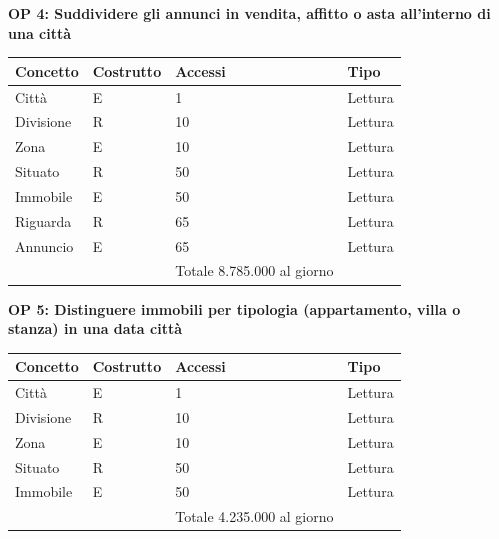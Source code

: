 \documentclass[a4paper,12pt]{report}
\begin{document}
            \textbf{OP 4: Suddividere gli annunci in vendita, affitto o asta all’interno di una città}
        	\begin{table}[h!]
            \centering
             \begin{tabular}{||l l l l||}
             \hline
             Concetto & Costrutto & Accessi & Tipo \\ [0.5ex] 
             \hline\hline
             Città & E & 1 & Lettura \\ 
             Divisione & R & 10 & Lettura \\ 
             Zona & E & 10 & Lettura \\ 
             Situato & R & 50 & Lettura \\ 
             Immobile & E & 50 & Lettura \\ 
             Riguarda & R & 65 & Lettura \\ 
             Annuncio & E & 65 & Lettura \\ 
             \hline
                &   & Totale  8.785.000 al giorno &  \\ [1ex] 
             \hline
             \end{tabular}
            \end{table}

            \textbf{OP 5: Distinguere immobili per tipologia (appartamento, villa o stanza) in una data città}
        	\begin{table}[h!]
            \centering
             \begin{tabular}{||l l l l||}
             \hline
             Concetto & Costrutto & Accessi & Tipo \\ [0.5ex] 
             \hline\hline
             Città & E & 1 & Lettura \\ 
             Divisione & R & 10 & Lettura \\ 
             Zona & E & 10 & Lettura \\ 
             Situato & R & 50 & Lettura \\ 
             Immobile & E & 50 & Lettura \\
             \hline
                &   & Totale  4.235.000 al giorno &  \\ [1ex] 
             \hline
             \end{tabular}
            \end{table}
\end{document}
